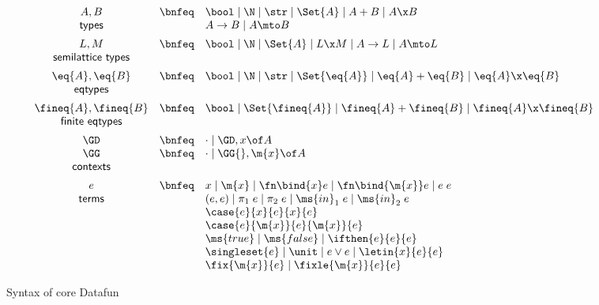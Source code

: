 \begin{figure}
  \[\begin{array}{ccl}
    A, B     &\bnfeq& \bool \pipe \N \pipe \str \pipe \Set{A}
    \pipe A + B \pipe A \x B\\
    \textsf{types} && A \uto B \pipe A \mto B
    \vspace{0.5em}\\
    L, M         &\bnfeq& \bool \pipe \N \pipe \Set{A}
    \pipe L \x M \pipe A \uto L \pipe A \mto L\\
    \textsf{semilattice types}
    \vspace{0.5em}\\
    \eq{A}, \eq{B} &\bnfeq& \bool \pipe \N \pipe \str \pipe \Set{\eq{A}}
    \pipe \eq{A} + \eq{B} \pipe \eq{A} \x \eq{B}\\
    \textsf{eqtypes} &&
    \vspace{0.5em}\\
    \fineq{A},\fineq{B}
    &\bnfeq& \bool \pipe \Set{\fineq{A}}
             \pipe \fineq{A} + \fineq{B} \pipe \fineq{A} \x \fineq{B}\\
    \textsf{finite eqtypes}
    \vspace{0.5em}\\
    \GD &\bnfeq& \cdot \pipe \GD, x\of A\\
    \GG &\bnfeq& \cdot \pipe \GG{},\m{x}\of A\\
    \textsf{contexts}
    \vspace{0.5em}\\
    e &\bnfeq& x \pipe \m{x} %
    \pipe \fn\bind{x} e \pipe \fn\bind{\m{x}} e
    \pipe e\;e\\
    \textsf{terms}
    && (e,e) \pipe \pi_1\;e \pipe \pi_2\;e
    \pipe \ms{in}_1\;e \pipe \ms{in}_2\;e\\
    && \case{e}{x}{e}{x}{e}\\
    && \case{e}{\m{x}}{e}{\m{x}}{e}\\
    && \ms{true} \pipe \ms{false} \pipe \ifthen{e}{e}{e}\\
    && \singleset{e} \pipe \unit \pipe e \vee e \pipe \letin{x}{e}{e}\\
    && \fix{\m{x}}{e} \pipe \fixle{\m{x}}{e}{e}
  \end{array}\]
  \caption{Syntax of core Datafun}
  \label{fig:syntax}
\end{figure}

